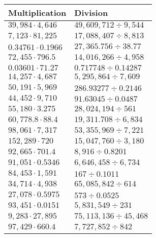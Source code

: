 \begin{longtable}[]{@{}ll@{}}
\toprule
Multiplication & Division\tabularnewline
\midrule
\endhead
\(39,984\cdot4,646\) & \(49,609,712÷9,544\)\tabularnewline
\(7,123\cdot81,225\) & \(17,088,407÷8,813\)\tabularnewline
\(0.34761\cdot0.1966\) & \(27,365.756÷38.77\)\tabularnewline
\(72,455\cdot796.5\) & \(14,016,266÷4,958\)\tabularnewline
\(0.03601\cdot71.27\) & \(0.717748÷0.14287\)\tabularnewline
\(14,257\cdot4,687\) & \(5,295,864÷7,609\)\tabularnewline
\(50,191\cdot5,969\) & \(286.93277÷0.2146\)\tabularnewline
\(44,452\cdot9,710\) & \(91.63045÷0.0487\)\tabularnewline
\(55,180\cdot3.275\) & \(28,024,194÷561\)\tabularnewline
\(60,778.8\cdot88.4\) & \(19,311.708÷6,834\)\tabularnewline
\(98,061\cdot7,317\) & \(53,355,969÷7,221\)\tabularnewline
\(152,289\cdot 720\) & \(15,047,760÷3,180\)\tabularnewline
\(92,665\cdot701.4\) & \(8,916÷0.8201\)\tabularnewline
\(91,051\cdot0.5346\) & \(6,646,458÷6,734\)\tabularnewline
\(84,453\cdot1,591\) & \(167÷0.1011\)\tabularnewline
\(34,714\cdot4,938\) & \(65,085,842÷614\)\tabularnewline
\(27,078\cdot0.5975\) & \(573÷0.0525\)\tabularnewline
\(93,451\cdot0.0151\) & \(5,831,549÷231\)\tabularnewline
\(9,283\cdot27,895\) & \(75,113,136÷45,468\)\tabularnewline
\(97,429\cdot660.4\) & \(7,727,852÷842\)\tabularnewline
\bottomrule
\end{longtable}
